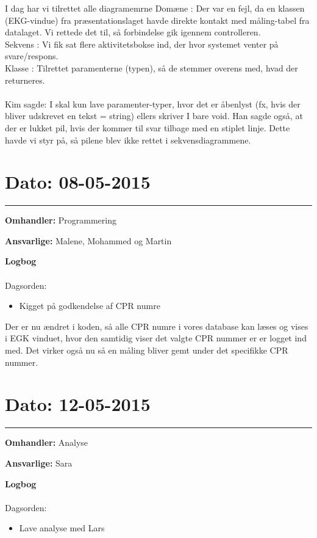 I dag har vi tilrettet alle diagramemrne
Domæne :  Der var en fejl, da en klassen (EKG-vindue) fra præsentationslaget havde direkte kontakt med måling-tabel fra datalaget. Vi rettede det til, så forbindelse gik igennem controlleren. 
\\
Sekvens : Vi fik sat flere aktivitetsbokse ind, der hvor systemet venter på svare/respons. 
\\
Klasse : Tilrettet paramenterne (typen), så de stemmer overens med, hvad der returneres. 
\\
\\
Kim sagde: I skal kun lave paramenter-typer, hvor det er åbenlyst (fx, hvis der bliver udskrevet en tekst = string) ellers skriver I bare void. 
Han sagde også, at der er lukket pil, hvis der kommer til svar tilbage med en stiplet linje. Dette havde vi styr på, så pilene blev ikke rettet i sekvensdiagrammene.  


\section{Dato: 08-05-2015}
\hrule
\textbf{Omhandler:} Programmering

\textbf{Ansvarlige:} Malene, Mohammed og Martin

\textbf{Logbog}
\\
\\
Dagsorden:
\begin{itemize}
	\item Kigget på godkendelse af CPR numre
\end{itemize}

Der er nu ændret i koden, så alle CPR numre i vores database kan læses og vises i EGK vinduet, hvor  den samtidig viser det valgte CPR nummer er er logget ind med. Det virker også nu så en måling bliver gemt under det specifikke CPR nummer. 







\section{Dato: 12-05-2015}
\hrule
\textbf{Omhandler:} Analyse

\textbf{Ansvarlige:} Sara

\textbf{Logbog}
\\
\\
Dagsorden:
\begin{itemize}
	\item Lave analyse med Lars
\end{itemize}

